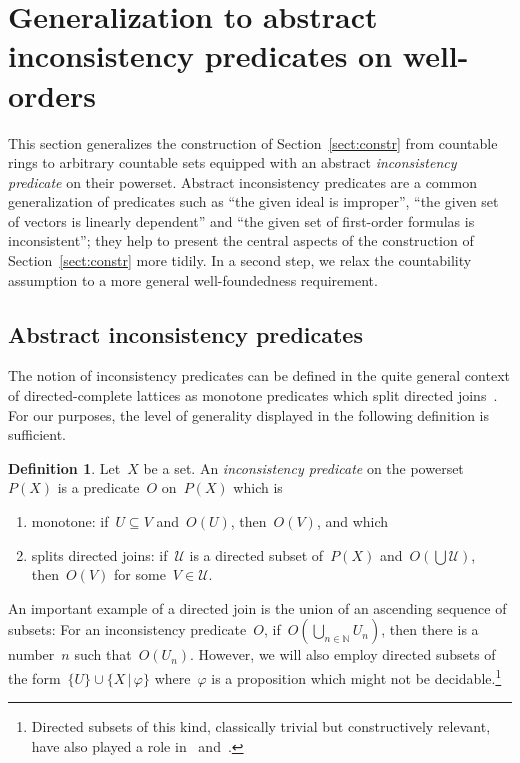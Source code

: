 \documentclass[com,11pt,crcready]{iosart2x}
\theoremstyle{definition}
\newtheorem{definition}{Definition}[section]
\theoremstyle{plain}
\theoremstyle{remark}
\newcommand{\?}{\,{:}\,}
\newcommand{\NN}{\mathbb{N}}
\renewcommand{\_}{\mathpunct{.}\,}
\begin{document}
\color{black}


\section{Generalization to abstract inconsistency predicates on well-orders}
\label{sect:inc-wf}

This section generalizes the construction of Section~\ref{sect:constr} from
countable rings to arbitrary countable sets equipped with an abstract
\emph{inconsistency predicate} on their powerset. Abstract inconsistency
predicates are a common generalization of predicates such as ``the given ideal is
improper'', ``the given set of vectors is linearly dependent'' and ``the given
set of first-order formulas is inconsistent''; they help to present the
central aspects of the construction of Section~\ref{sect:constr} more tidily.
In a second step, we relax the countability assumption to a more general
well-foundedness requirement.


\subsection{Abstract inconsistency predicates}

The notion of inconsistency predicates can be defined in the quite general
context of directed-complete lattices as monotone predicates which split
directed joins~\cite{schuster-wessel:jacincpred}. For our purposes, the level of generality displayed in the
following definition is sufficient.

\begin{definition}Let~$X$ be a set. An \emph{inconsistency predicate} on the
powerset~$P(X)$ is a predicate~$O$ on~$P(X)$ which is
\begin{enumerate}
\item monotone: if~$U \subseteq V$ and~$O(U)$, then~$O(V)$, and which
\item splits directed joins: if~$\mathcal{U}$ is a directed subset of~$P(X)$
and~$O(\bigcup \mathcal{U})$, then~$O(V)$ for some~$V \in \mathcal{U}$.
\end{enumerate}
\end{definition}

An important example of a directed join is the union of an ascending sequence
of subsets: For an inconsistency predicate~$O$, if~$O(\bigcup_{n \in \NN}
U_n)$, then there is a number~$n$ such that~$O(U_n)$. However, we will also
employ directed subsets of the form~$\{ U \} \cup \{ X \,|\, \varphi \}$
where~$\varphi$ is a proposition which might not be
decidable.\footnote{Directed subsets of this kind, classically trivial but
constructively relevant, have also played a role
in~\cite[Lemma~1]{schuster-wessel:jacincpred}
and~\cite[Example~I.1.7(2)]{moerdijk-vermeulen:proper-maps}.}
\end{document}
